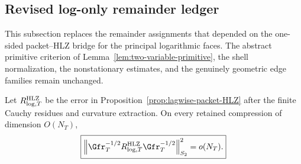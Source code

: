 \subsection{Revised log-only remainder ledger}
\label{sec:logonly-remainder-ledger}

This subsection replaces the remainder assignments that depended on the
one-sided packet--HLZ bridge for the principal logarithmic faces.  The abstract
primitive criterion of Lemma~\ref{lem:two-variable-primitive}, the shell
normalization, the nonstationary estimates, and the genuinely geometric edge
families remain unchanged.

\begin{lemma}
\label{lem:lagwise-HLZ-error-regular}
Let $R_{\log,T}^{\rm HLZ}$ be the error in
Proposition~\ref{prop:lagwise-packet-HLZ} after the finite Cauchy residues and
curvature extraction.  On every retained compression of dimension $O(N_T)$,
\begin{equation}
\boxed{
\left\|\Gfr_T^{-1/2}R_{\log,T}^{\rm HLZ}\Gfr_T^{-1/2}\right\|_{S_2}^2
=o(N_T).
}
\label{eq:lagwise-HLZ-relative-HS}
\end{equation}
\end{lemma}


